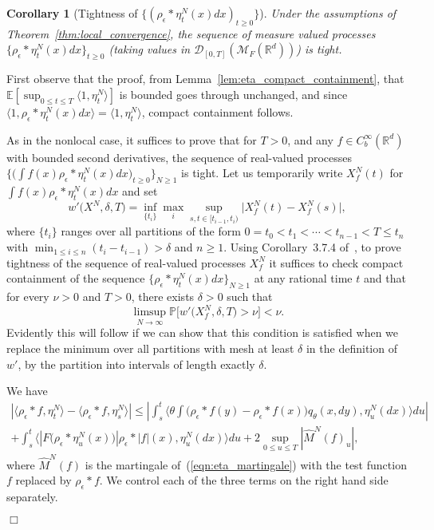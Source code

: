 \documentclass[12pt]{article}
\newenvironment {proof}{{\noindent\bf Proof }}{\hfill $\Box$ \medskip}
\newtheorem{corollary}[theorem]{Corollary}
\newcommand{\IP}{\mathbb P}
\newcommand{\IE}{\mathbb E}
\newcommand{\IR}{\mathbb R}
\newcommand{\measures}{\mathcal{M}_F(\IR^d)} %
\numberwithin{equation}{section}
\begin{document}
\begin{corollary}[Tightness of $\{(\rho_\epsilon*\eta_t^N(x) dx)_{t\geq 0}\}$]
\label{lem:density_tightness} 
Under the assumptions of Theorem~\ref{thm:local_convergence},
the sequence of measure valued processes $\{ \rho_\epsilon*\eta_t^N(x) dx \}_{t \geq 0}$
	(taking values in ${\mathcal D}_{[0,T]}(\measures)$) is tight.
\end{corollary}
\begin{proof}

First observe that the proof, from Lemma~\ref{lem:eta_compact_containment}, 
that 
$\IE[\sup_{0\leq t\leq T} \langle 1,\eta_t^N\rangle]$ is 
bounded goes through unchanged, and since 
$\langle 1, \rho_\epsilon*\eta_t^N(x)dx\rangle=\langle 1, \eta_t^N\rangle$,  
compact containment follows.
 
As in the nonlocal case, it suffices to prove that for $T>0$,
and any $f\in C_b^\infty (\IR^d)$ with bounded second derivatives, the
sequence of real-valued processes 
$\big\{\big(\int f(x)\rho_\epsilon*\eta_t^N(x)dx\big)_{t\geq 0}\big\}_{N\geq 1}$ is tight.  
Let us temporarily write $X_f^N(t)$ for $\int f(x)\rho_\epsilon*\eta_t^N(x)dx$
and set
\[
w'\big(X^N,\delta,T\big)= \inf_{\{t_i\}}\max_i\sup_{s,t\in [t_{i-1},t_i)}
\big| X_f^N(t)-X_f^N(s)\big|,
\]
where $\{t_i\}$ ranges over all partitions of the form 
$0=t_0<t_1<\cdots <t_{n-1}<T\leq t_n$ with 
$\min_{1\leq i\leq n}(t_i-t_{i-1})>\delta$ and $n\geq 1$.
Using Corollary~3.7.4 of~\cite{ethier/kurtz:1986}, 
to prove tightness
of the sequence of real-valued processes $X_f^N$
it suffices to check compact containment of 
the sequence $\{\rho_\epsilon*\eta_t^N(x)dx\}_{N\geq 1}$ at any rational time $t$ and
that for every $\nu>0$ and $T>0$, there exists $\delta>0$ such that
\[
\limsup_{N\to\infty}\IP\big[w'\big(X_f^N,\delta,T\big)>\nu\big]<\nu.
\]
Evidently this will follow 
if we can show that this condition is satisfied when we replace the 
minimum over all partitions with mesh at least $\delta$ in the 
definition of $w'$, by the partition into
intervals of length exactly $\delta$.

We have
\begin{multline}
\label{tightness estimate}
\left|
\langle \rho_{\epsilon} * f, \eta_t^N \rangle 
- \langle \rho_{\epsilon} * f, \eta_s^N \rangle            
\right|
\leq
\left|
\int_s^t\Big\langle\theta\int\big(\rho_\epsilon*f(y)-\rho_\epsilon*f(x)\big)
q_{\theta}(x,dy),\eta_u^N(dx)\Big\rangle du
\right|
\\
+\int_s^t\Big\langle |F\big(\rho_\epsilon*\eta_u^N(x)\big)|\rho_\epsilon*|f|(x), 
\eta_u^N(dx)\Big\rangle du +2\sup_{0\leq u\leq T}|\widehat{M}^N(f)_u|,
\end{multline}
where $\widehat{M}^N(f)$ is the martingale of~(\ref{eqn:eta_martingale})
with the test function $f$ replaced by $\rho_\epsilon*f$. 
We control each of the three terms on the right hand side separately.


\end{proof}
\end{document}
